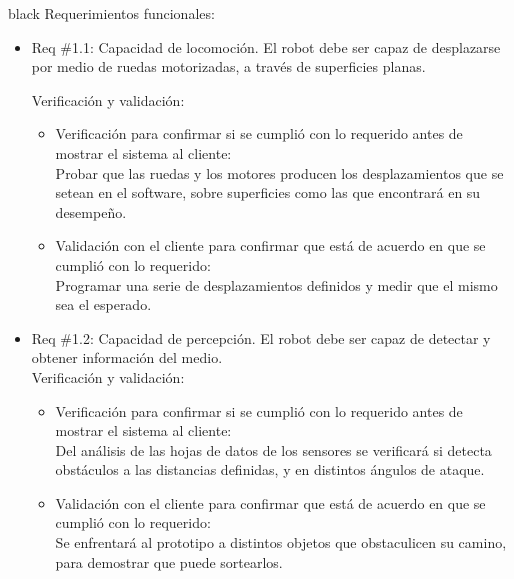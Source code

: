 \documentclass[11pt]{charter}
\begin{document}
\begin{consigna}{black}
Requerimientos  funcionales:

\begin{itemize} 
\item Req \#1.1: Capacidad de locomoción.  El robot debe ser capaz de desplazarse por medio de ruedas motorizadas, a través de superficies planas.

Verificación y validación:
\begin{itemize}
\item Verificación para confirmar si se cumplió con lo requerido antes de mostrar el
sistema al cliente:\\
Probar que las ruedas y los motores producen los desplazamientos que se setean en el software, sobre superficies como las que encontrará en su desempeño.\\
\item Validación con el cliente para confirmar que está de acuerdo en que se cumplió con lo requerido:\\ Programar una serie de desplazamientos definidos y medir que el mismo sea el esperado.\\
\end{itemize}

\item Req \#1.2: Capacidad de percepción. El robot debe ser capaz de detectar y obtener información del medio.\\
Verificación y validación:
\begin{itemize}
\item Verificación para confirmar si se cumplió con lo requerido antes de mostrar el
sistema al cliente:\\
Del análisis de las hojas de datos de los sensores se verificará si detecta obstáculos a las distancias definidas, y en distintos ángulos de ataque.\\
\item Validación con el cliente para confirmar que está de acuerdo en que se cumplió con lo requerido:\\ Se enfrentará al prototipo a distintos objetos que obstaculicen su camino, para demostrar que puede sortearlos.\\
\end{itemize}


\end{itemize}
\end{consigna}
\end{document}
